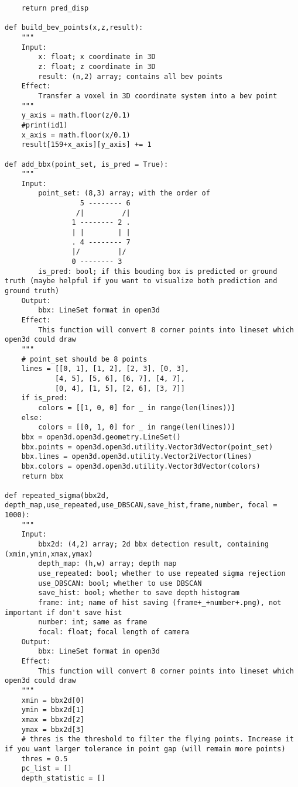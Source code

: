 \begin{verbatim}
    return pred_disp

def build_bev_points(x,z,result):
    """
    Input:
        x: float; x coordinate in 3D
        z: float; z coordinate in 3D
        result: (n,2) array; contains all bev points
    Effect:
        Transfer a voxel in 3D coordinate system into a bev point
    """
    y_axis = math.floor(z/0.1)
    #print(id1)
    x_axis = math.floor(x/0.1)
    result[159+x_axis][y_axis] += 1

def add_bbx(point_set, is_pred = True):
    """
    Input:
        point_set: (8,3) array; with the order of 
                  5 -------- 6
                 /|         /|
                1 -------- 2 .
                | |        | |
                . 4 -------- 7
                |/         |/
                0 -------- 3
        is_pred: bool; if this bouding box is predicted or ground truth (maybe helpful if you want to visualize both prediction and ground truth)
    Output:
        bbx: LineSet format in open3d
    Effect:
        This function will convert 8 corner points into lineset which open3d could draw
    """
    # point_set should be 8 points
    lines = [[0, 1], [1, 2], [2, 3], [0, 3],
            [4, 5], [5, 6], [6, 7], [4, 7],
            [0, 4], [1, 5], [2, 6], [3, 7]]
    if is_pred:
        colors = [[1, 0, 0] for _ in range(len(lines))]
    else:
        colors = [[0, 1, 0] for _ in range(len(lines))]
    bbx = open3d.open3d.geometry.LineSet()
    bbx.points = open3d.open3d.utility.Vector3dVector(point_set)
    bbx.lines = open3d.open3d.utility.Vector2iVector(lines)
    bbx.colors = open3d.open3d.utility.Vector3dVector(colors)
    return bbx

def repeated_sigma(bbx2d, depth_map,use_repeated,use_DBSCAN,save_hist,frame,number, focal = 1000):
    """
    Input:
        bbx2d: (4,2) array; 2d bbx detection result, containing (xmin,ymin,xmax,ymax)
        depth_map: (h,w) array; depth map
        use_repeated: bool; whether to use repeated sigma rejection
        use_DBSCAN: bool; whether to use DBSCAN
        save_hist: bool; whether to save depth histogram
        frame: int; name of hist saving (frame+_+number+.png), not important if don't save hist
        number: int; same as frame
        focal: float; focal length of camera
    Output:
        bbx: LineSet format in open3d
    Effect:
        This function will convert 8 corner points into lineset which open3d could draw
    """
    xmin = bbx2d[0]
    ymin = bbx2d[1]
    xmax = bbx2d[2]
    ymax = bbx2d[3]
    # thres is the threshold to filter the flying points. Increase it if you want larger tolerance in point gap (will remain more points)
    thres = 0.5
    pc_list = []
    depth_statistic = []


\end{verbatim}
